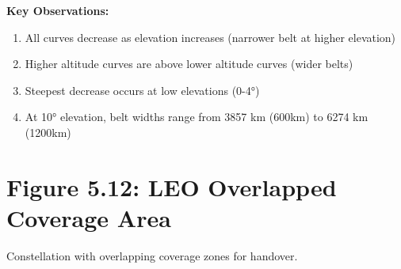 \documentclass[11pt,letterpaper]{article}
\begin{document}
\textbf{Key Observations:}
\begin{enumerate}
    \item All curves decrease as elevation increases (narrower belt at higher elevation)
    \item Higher altitude curves are above lower altitude curves (wider belts)
    \item Steepest decrease occurs at low elevations (0-4°)
    \item At 10° elevation, belt widths range from 3857 km (600km) to 6274 km (1200km)
\end{enumerate}

\newpage

\section*{Figure 5.12: LEO Overlapped Coverage Area}

Constellation with overlapping coverage zones for handover.
\end{document}
